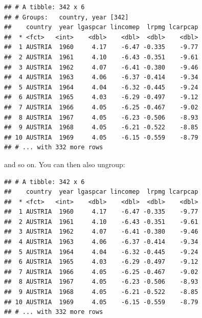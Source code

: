 \documentclass[]{gitbook}
\newenvironment{Shaded}{\begin{snugshade}}{\end{snugshade}}
\newcommand{\KeywordTok}[1]{\textcolor[rgb]{0.13,0.29,0.53}{\textbf{#1}}}
\newcommand{\NormalTok}[1]{#1}
\newcommand{\OperatorTok}[1]{\textcolor[rgb]{0.81,0.36,0.00}{\textbf{#1}}}
\newcommand{\StringTok}[1]{\textcolor[rgb]{0.31,0.60,0.02}{#1}}
\theoremstyle{definition}
\theoremstyle{definition}
\theoremstyle{definition}
\theoremstyle{remark}
\begin{document}
\begin{Shaded}
\end{Shaded}

\begin{verbatim}
## # A tibble: 342 x 6
## # Groups:   country, year [342]
##    country  year lgaspcar lincomep  lrpmg lcarpcap
##  * <fct>   <int>    <dbl>    <dbl>  <dbl>    <dbl>
##  1 AUSTRIA  1960     4.17    -6.47 -0.335    -9.77
##  2 AUSTRIA  1961     4.10    -6.43 -0.351    -9.61
##  3 AUSTRIA  1962     4.07    -6.41 -0.380    -9.46
##  4 AUSTRIA  1963     4.06    -6.37 -0.414    -9.34
##  5 AUSTRIA  1964     4.04    -6.32 -0.445    -9.24
##  6 AUSTRIA  1965     4.03    -6.29 -0.497    -9.12
##  7 AUSTRIA  1966     4.05    -6.25 -0.467    -9.02
##  8 AUSTRIA  1967     4.05    -6.23 -0.506    -8.93
##  9 AUSTRIA  1968     4.05    -6.21 -0.522    -8.85
## 10 AUSTRIA  1969     4.05    -6.15 -0.559    -8.79
## # ... with 332 more rows
\end{verbatim}

and so on. You can then also ungroup:

\begin{Shaded}
\end{Shaded}

\begin{verbatim}
## # A tibble: 342 x 6
##    country  year lgaspcar lincomep  lrpmg lcarpcap
##  * <fct>   <int>    <dbl>    <dbl>  <dbl>    <dbl>
##  1 AUSTRIA  1960     4.17    -6.47 -0.335    -9.77
##  2 AUSTRIA  1961     4.10    -6.43 -0.351    -9.61
##  3 AUSTRIA  1962     4.07    -6.41 -0.380    -9.46
##  4 AUSTRIA  1963     4.06    -6.37 -0.414    -9.34
##  5 AUSTRIA  1964     4.04    -6.32 -0.445    -9.24
##  6 AUSTRIA  1965     4.03    -6.29 -0.497    -9.12
##  7 AUSTRIA  1966     4.05    -6.25 -0.467    -9.02
##  8 AUSTRIA  1967     4.05    -6.23 -0.506    -8.93
##  9 AUSTRIA  1968     4.05    -6.21 -0.522    -8.85
## 10 AUSTRIA  1969     4.05    -6.15 -0.559    -8.79
## # ... with 332 more rows
\end{verbatim}
\end{document}
